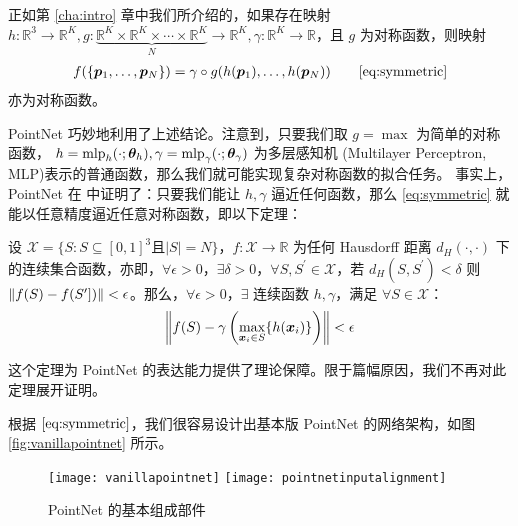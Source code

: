 正如第 \ref{cha:intro} 章中我们所介绍的，如果存在映射 $h: \mathbb{R}^3 \to \mathbb{R}^K,
	g: \underbrace{\mathbb{R}^K \times \mathbb{R}^K \times \cdots \times \mathbb{R}^K}_{N} \to \mathbb{R}^K, \gamma: \mathbb{R}^K \to \mathbb{R}$，且 $g$ 为对称函数，则映射 %
\begin{align}
	f(\{\bm p_1, \ldots, \bm p_N \}) = \gamma \circ g(h(\bm p_1), \ldots, h(\bm p_N)) \tag*{\ref{eq:symmetric}}
\end{align}
亦为对称函数。

PointNet 巧妙地利用了上述结论。注意到，只要我们取 $g = \max$ 为简单的对称函数，
$h = \MLP_h(\cdot; \bm \theta_h), \gamma = \MLP_\gamma(\cdot; \bm \theta_\gamma)$ 为多层感知机 (Multilayer Perceptron, MLP)表示的普通函数，那么我们就可能实现复杂对称函数的拟合任务。
事实上，PointNet 在  中证明了：只要我们能让 $h, \gamma$ 逼近任何函数，那么 \eqref{eq:symmetric} 就能以任意精度逼近任意对称函数，即以下定理：
\begin{theorem}
	\kaishu
	设 $\mathcal{X} = \{S: S \subseteq [0, 1]^3 \text{且} \left|S\right| = N\}$，$f: \mathcal{X} \to \mathbb{R}$ 为任何 Hausdorff 距离 $d_H(\cdot, \cdot)$ 下的连续集合函数，亦即，$\forall \epsilon >0$，$\exists \delta > 0$，$\forall S, S^\prime \in \mathcal{X}$，若 $d_H(S, S^\prime) < \delta$ 则 $\Norm*{ f(S) - f(S^\prime]) } < \epsilon$。那么，$\forall \epsilon > 0$，$ \exists $ 连续函数 $h, \gamma$，满足 $\forall S \in \mathcal{X}$：
	\begin{align}
		\Norm*{ f(S) - \gamma \left( \max_{\bm x_i \in S} \{  h(\bm x_i)  \} \right)  } < \epsilon
	\end{align}
\end{theorem}
这个定理为 PointNet 的表达能力提供了理论保障。限于篇幅原因，我们不再对此定理展开证明。

根据 $\eqref{eq:symmetric}$，我们很容易设计出基本版 PointNet 的网络架构，如图 \ref{fig:vanillapointnet} 所示。

\begin{figure}[h]
	\centering%
	{\texttt{[image: vanillapointnet]}}%
	\hspace{0em}%
	{\texttt{[image: pointnetinputalignment]}}
	\caption{PointNet\cite{pointnet} 的基本组成部件}\label{fig:pointnetelement}
\end{figure}




